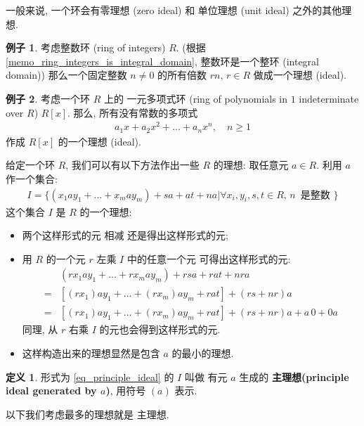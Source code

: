 \documentclass[utf8]{ctexbook}
\theoremstyle{definition}
\newtheorem{protodefinition}{定义}[section]
\newenvironment{definition}
   {\colorlet{shadecolor}{black!15}\begin{shaded}\begin{protodefinition}}
   {\end{protodefinition}\end{shaded}}
\newtheorem{example}{例子}[section]
\begin{document}
一般来说, 一个环会有零理想 (zero ideal) 和 单位理想 (unit ideal) 之外的其他理想.

\begin{example}\label{example_principle_ideal_generated_by_n}
考虑整数环 (ring of integers) $R$. (根据 \ref{memo_ring_integers_is_integral_domain}, 整数环是一个整环 (integral domain)) 那么一个固定整数 $n \neq 0 $ 的所有倍数 $rn$, $r \in R$ 做成一个理想 (ideal).
\end{example}

\begin{example}
考虑一个环 $R$ 上的 一元多项式环 (ring of polynomials in $1$ indeterminate over $R$) $R[x]$. 那么, 所有没有常数的多项式
\begin{align*}
a_1 x + a_2 x^2 + \ldots + a_n x^n, \quad n \geq 1
\end{align*}
作成 $R[x]$ 的一个理想 (ideal).
\end{example}

给定一个环 $R$, 我们可以有以下方法作出一些 $R$ 的理想: 取任意元 $a \in R$. 利用 $a$ 作一个集合:
\begin{align}
I = \big\{ (x_1 a y_1 + \ldots + x_m a y_m)  + sa + at + n a | \forall x_i, y_i, s, t \in R, \, n \, \mbox{ 是整数 } \big\} \label{eq_principle_ideal}
\end{align}
这个集合 $I$ 是 $R$ 的一个理想:
\begin{itemize}
\item{两个这样形式的元 相减 还是得出这样形式的元;}
\item{用 $R$ 的一个元 $r$ 左乘 $I$ 中的任意一个元 可得出这样形式的元:
\begin{align*}
& (r x_1 a y_1 + \ldots + r x_m a y_m)  +  r sa + rat + n r a  \\
=& [(r x_1) a y_1 + \ldots + (r x_m) a y_m + rat ] +  (r s + n r ) a \\
=&   [(r x_1) a y_1 + \ldots + (r x_m) a y_m + rat ] +  (r s + n r ) a  + a \, 0 + 0 a 
\end{align*}
同理, 从 $r$ 右乘 $I$ 的元也会得到这样形式的元.
}
\item{这样构造出来的理想显然是包含 $a$ 的最小的理想. }
\end{itemize}

\begin{definition}\label{def_principle_ideal}
形式为 \ref{eq_principle_ideal} 的 $I$ 叫做 有元 $a$ 生成的 \textbf{主理想(principle ideal generated by $a$)}, 用符号 $(a)$ 表示.
\end{definition}

以下我们考虑最多的理想就是 主理想.
\end{document}
